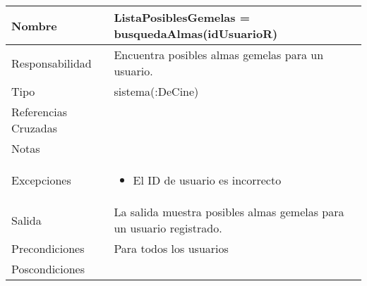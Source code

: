 \documentclass{article}
\begin{document}
\begin{table}[h]
\begin{tabular}{|l|l|l|l|l|l|}
\hline
\multicolumn{2}{|p{3cm}|}{Nombre} & \multicolumn{4}{p{10cm}|}{\textbf{ListaPosiblesGemelas = busquedaAlmas(idUsuarioR)}}\\
\hline
\multicolumn{2}{|p{3cm}|}{Responsabilidad} & \multicolumn{4}{p{10cm}|}{Encuentra posibles almas gemelas para un usuario.} \\
\hline
\multicolumn{2}{|p{3cm}|}{Tipo} & \multicolumn{4}{p{10cm}|}{sistema(:DeCine)} \\
\hline
\multicolumn{2}{|p{3cm}|}{Referencias Cruzadas} & \multicolumn{4}{p{10cm}|}{} \\
\hline
\multicolumn{2}{|p{3cm}|}{Notas} & \multicolumn{4}{p{10cm}|}{} \\
\hline
\multicolumn{2}{|p{3cm}|}{Excepciones} & \multicolumn{4}{p{10cm}|}{\begin{itemize}
\item El ID de usuario es incorrecto 
\end{itemize}} \\
\hline
\multicolumn{2}{|p{3cm}|}{Salida} & \multicolumn{4}{p{10cm}|}{La salida muestra posibles almas gemelas para un usuario registrado.} \\
\hline
\multicolumn{2}{|p{3cm}|}{Precondiciones} & \multicolumn{4}{p{10cm}|}{Para todos los usuarios} \\
\hline
\multicolumn{2}{|p{3cm}|}{Poscondiciones} & \multicolumn{4}{p{10cm}|}{} \\
\hline
\end{tabular}
\end{table}

\clearpage
\end{document}

